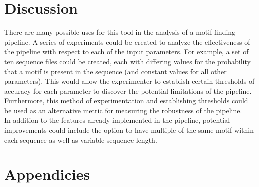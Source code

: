 \documentclass[12pt]{article}
\begin{document}
\section{Discussion}
There are many possible uses for this tool in the analysis of a motif-finding pipeline. A series of experiments could be created to analyze the effectiveness of the pipeline with respect to each of the input parameters. For example, a set of ten sequence files could be created, each with differing values for the probability that a motif is present in the sequence (and constant values for all other parameters). This would allow the experimenter to establish certain thresholds of accuracy for each parameter to discover the potential limitations of the pipeline. Furthermore, this method of experimentation and establishing thresholds could be used as an alternative metric for measuring the robustness of the pipeline. \\
\indent In addition to the features already implemented in the pipeline, potential improvements could include the option to have multiple of the same motif within each sequence as well as variable sequence length.


\section{Appendicies}
\end{document}
